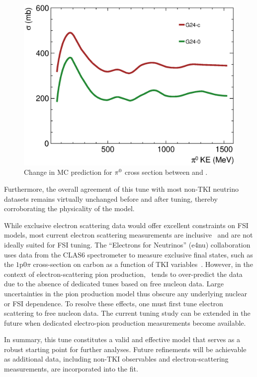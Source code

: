 \begin{figure}[!htb] 	
    \centering 		
    \includegraphics[width=\sgfigwid\textwidth]{figures/tuning/pi0mfp_change_covfix.eps}
    \caption{\label{fig:pizmfp_change} Change in MC prediction for $\pi^0$ cross section between \gZero and \gC. } 
\end{figure}
Furthermore, the overall agreement of this tune with most non-TKI neutrino datasets remains virtually unchanged before and after tuning, thereby corroborating the physicality of the model.

While exclusive electron scattering data would offer excellent constraints on FSI models, most current electron scattering measurements are inclusive~\cite{electronsforneutrinos:2020tbf} and are not ideally suited for FSI tuning.
The ``Electrons for Neutrinos'' (e4nu) collaboration uses data from the CLAS6 spectrometer to measure exclusive final states, such as the $1\textrm{p}0\pi$ cross-section on carbon as a function of TKI variables~\cite{CLAS:2021neh}.
However, in the context of electron-scattering pion production, \genie\ tends to over-predict the data due to the absence of dedicated tunes based on free nucleon data. 
Large uncertainties in the pion production model thus obscure any underlying nuclear or FSI dependence. 
To resolve these effects, one must first tune electron scattering to free nucleon data. 
The current tuning study can be extended in the future when dedicated electro-pion production measurements become available.

In summary, this tune constitutes a valid and effective model that serves as a robust starting point for further analyses. 
Future refinements will be achievable as additional data, including non-TKI observables and electron-scattering measurements, are incorporated into the fit.

